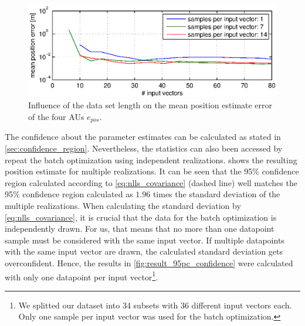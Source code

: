 \begin{figure}[hbtp]
\centering
\includegraphics[width = \textwidth]{images/results/input_length_vs_position_error.eps}
\caption{Influence of the data set length on the mean position estimate error of the four AUs $e_{pos}$.}
\label{fig:result_inputlength}
\end{figure}

The confidence about the parameter estimates can be calculated as stated in \cref{sec:confidence_region}.
Nevertheless, the statistics can also been accessed by repeat the batch optimization using independent realizations.
 shows the resulting position estimate for multiple realizations.
It can be seen that the 95\% confidence region calculated according to \cref{eq:nlls_covariance} (dashed line) well matches the 95\% confidence region calculated as $1.96$ times the standard deviation of the multiple realizations.
When calculating the standard deviation by \cref{eq:nlls_covariance}, it is crucial that the data for the batch optimization is independently drawn.
For us, that means that no more than one datapoint sample must be considered with the same input vector.
If multiple datapoints with the same input vector are drawn, the calculated standard deviation gets overconfident.
Hence, the results in \cref{fig:result_95pc_confidence} were calculated with only one datapoint per input vector\footnote{
We splitted our dataset into 34 subsets with 36 different input vectors each. Only one sample per input vector was used for the batch optimization.}.

